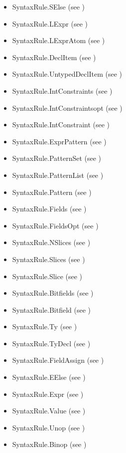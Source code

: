 \begin{itemize}
  \item SyntaxRule.SElse (see )
  \item SyntaxRule.LExpr (see )
  \item SyntaxRule.LExprAtom (see )
  \item SyntaxRule.DeclItem (see )
  \item SyntaxRule.UntypedDeclItem (see )
  \item SyntaxRule.IntConstraints (see )
  \item SyntaxRule.IntConstraintsopt (see )
  \item SyntaxRule.IntConstraint (see )
  \item SyntaxRule.ExprPattern (see )
  \item SyntaxRule.PatternSet (see )
  \item SyntaxRule.PatternList (see )
  \item SyntaxRule.Pattern (see )
  \item SyntaxRule.Fields (see )
  \item SyntaxRule.FieldsOpt (see )
  \item SyntaxRule.NSlices (see )
  \item SyntaxRule.Slices (see )
  \item SyntaxRule.Slice (see )
  \item SyntaxRule.Bitfields (see )
  \item SyntaxRule.Bitfield (see )
  \item SyntaxRule.Ty (see )
  \item SyntaxRule.TyDecl (see )
  \item SyntaxRule.FieldAssign (see )
  \item SyntaxRule.EElse (see )
  \item SyntaxRule.Expr (see )
  \item SyntaxRule.Value (see )
  \item SyntaxRule.Unop (see )
  \item SyntaxRule.Binop (see )
\end{itemize}

